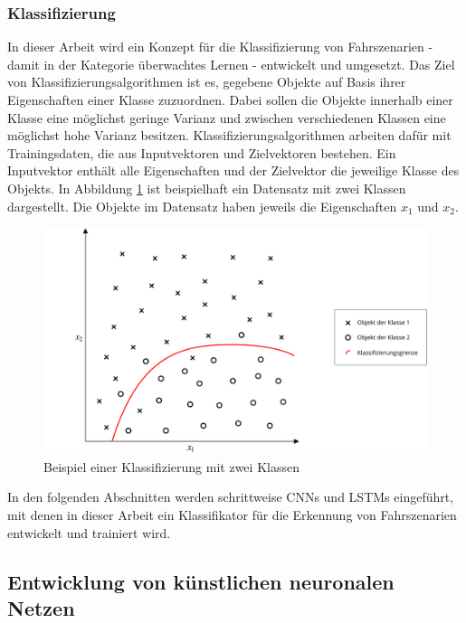 \subsubsection{Klassifizierung}

In dieser Arbeit wird ein Konzept für die Klassifizierung von Fahrszenarien - damit in der Kategorie überwachtes Lernen - entwickelt und umgesetzt. Das Ziel von Klassifizierungsalgorithmen ist es, gegebene Objekte auf Basis ihrer Eigenschaften einer Klasse zuzuordnen. Dabei sollen die Objekte innerhalb einer Klasse eine möglichst geringe Varianz und zwischen verschiedenen Klassen eine möglichst hohe Varianz besitzen. Klassifizierungsalgorithmen arbeiten dafür mit Trainingsdaten, die aus Inputvektoren und Zielvektoren bestehen. Ein Inputvektor enthält alle Eigenschaften und der Zielvektor die jeweilige Klasse des Objekts. In Abbildung \ref{fig_klassifizierung} ist beispielhaft ein Datensatz mit zwei Klassen dargestellt. Die Objekte im Datensatz haben jeweils die Eigenschaften $x_1$ und $x_2$.

\begin{figure}[h]
\centering
\includegraphics[scale=0.5]{images/klassifizierung.pdf}
\caption{Beispiel einer Klassifizierung mit zwei Klassen}
\label{fig_klassifizierung}
\end{figure}

In den folgenden Abschnitten werden schrittweise \acp{CNN} und \acp{LSTM} eingeführt, mit denen in dieser Arbeit ein Klassifikator für die Erkennung von Fahrszenarien entwickelt und trainiert wird.


\subsection{Entwicklung von künstlichen neuronalen Netzen}
\label{grundlagen_nn_entwicklung}

